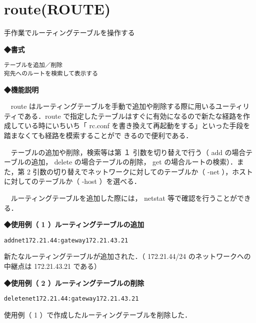 \label{cmd:route}
\section{route(ROUTE)}
手作業でルーティングテーブルを操作する\par

{\bf ◆書式}
\begin{center}
\begin{screen}
\begin{alltt}
 テーブルを追加／削除
 % route [add | delete] [-net | -host ] 宛先 中継点 [netmask] ネットマスク
 宛先へのルートを検索して表示する
 % route get 宛先
\end{alltt}
\end{screen}
\end{center}

{\bf ◆機能説明}

　route はルーティングテーブルを手動で追加や削除する際に用いるユーティリティである．route で指定したテーブルはすぐに有効になるので新たな経路を作成している時にいちいち「 rc.conf を書き換えて再起動をする」といった手段を踏まなくても経路を模索することがで
きるので便利である．\par
　テーブルの追加や削除，検索等は第 １ 引数を切り替えで行う（ add の場合テーブルの追加， delete の場合テーブルの削除， get の場合ルートの検索）．また，第 2 引数の切り替えでネットワークに対してのテーブルか（ -net ），ホストに対してのテーブルか（ -host ）を選べる．\par
　ルーティングテーブルを追加した際には， netstat 等で確認を行うことができる．\par

{\bf ◆使用例（ 1 ）ルーティングテーブルの追加}
\begin{center}
\begin{breakbox}
\begin{alltt}
 % \underline{route add -net 172.21.44172.21.43.21 -netmask 255.255.255.0}  \keybox{Enter}
 add net 172.21.44:gateway 172.21.43.21
 %
\end{alltt}
\end{breakbox}
\end{center}

新たなルーティングテーブルが追加された．（ 172.21.44/24 のネットワークへの中継点は 172.21.43.21 である）\par

{\bf ◆使用例（ 2 ）ルーティングテーブルの削除}
\begin{center}
\begin{breakbox}
\begin{alltt}
 % \underline{route delete -net 172.21.44172.21.43.21 -netmask 255.255.255.0}  \keybox{Enter}
 delete net 172.21.44:gateway 172.21.43.21
 %
\end{alltt}
\end{breakbox}
\end{center}

使用例（ 1 ）で作成したルーティングテーブルを削除した．\par

\clearpage
